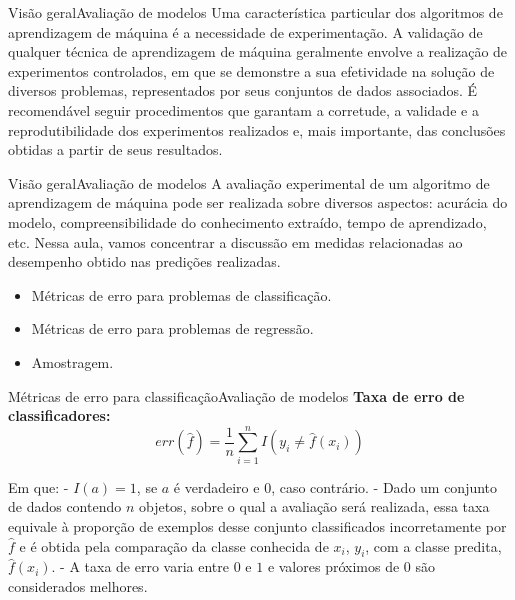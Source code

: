 \documentclass[t]{beamer}
\begin{document}

\begin{ftst}{Visão geral}{Avaliação de modelos}
\justifying
Uma característica particular dos algoritmos de aprendizagem de máquina é a necessidade de experimentação.
\vone
A validação de qualquer técnica de aprendizagem de máquina geralmente envolve a realização de experimentos controlados, em que se demonstre a sua efetividade na solução de diversos problemas, representados por seus conjuntos de dados associados.
\vone
É recomendável seguir procedimentos que garantam a corretude, a validade e a reprodutibilidade dos experimentos realizados e, mais importante, das conclusões obtidas a partir de seus resultados.

\end{ftst}


\begin{ftst}{Visão geral}{Avaliação de modelos}
\justifying
A avaliação experimental de um algoritmo de aprendizagem de máquina pode ser realizada sobre diversos aspectos: acurácia do modelo, compreensibilidade do conhecimento extraído, tempo de aprendizado, etc.
\vone
Nessa aula, vamos concentrar a discussão em medidas relacionadas ao desempenho obtido nas predições realizadas.
\vone
\begin{itemize}
    \item Métricas de erro para problemas de classificação.
    \item Métricas de erro para problemas de regressão.
    \item Amostragem.
\end{itemize}

\end{ftst}


\begin{ftst}{Métricas de erro para classificação}{Avaliação de modelos}
\justifying
\textbf{Taxa de erro de classificadores:}
\begin{equation}
    err(\hat{f}) = \frac{1}{n} \sum^n_{i=1} I(y_i \neq \hat{f}(x_i))
\end{equation}

Em que:
\vone
- $I(a) = 1$, se $a$ é verdadeiro e $0$, caso contrário.
\vone
- Dado um conjunto de dados contendo $n$ objetos, sobre o qual a avaliação será realizada, essa taxa equivale à proporção de exemplos desse conjunto classificados incorretamente por $\hat{f}$ e é obtida pela comparação da classe conhecida de $x_i$, $y_i$, com a classe predita, $\hat{f}(x_i)$.
\vone
- A taxa de erro varia entre $0$ e $1$ e valores próximos de $0$ são considerados melhores.


\end{ftst}
\end{document}
